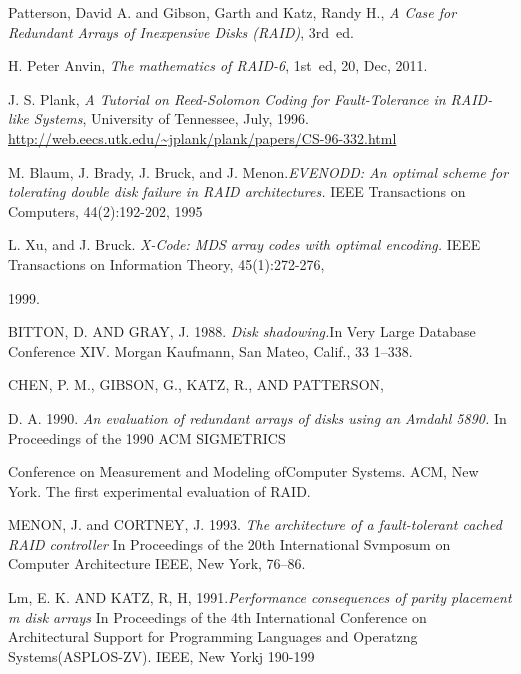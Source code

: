 \documentclass[journal]{IEEEtran}
\begin{document}
\begin{thebibliography}{1}


Patterson, David A. and Gibson, Garth and Katz, Randy H., \emph{A Case for Redundant Arrays of Inexpensive Disks (RAID)}, 3rd~ed.

H. Peter Anvin, \emph{The mathematics of RAID-6}, 1st~ed, 20, Dec, 2011.

J. S. Plank, \emph{A Tutorial on Reed-Solomon Coding for Fault-Tolerance in RAID-like Systems},  University of Tennessee, July, 1996. \url{http://web.eecs.utk.edu/~jplank/plank/papers/CS-96-332.html}


M. Blaum, J. Brady, J. Bruck, and J. Menon.\emph {EVENODD: An optimal scheme for tolerating double disk failure in RAID architectures.} IEEE Transactions on Computers, 44(2):192-202, 1995



L. Xu, and J. Bruck. \emph {X-Code: MDS array codes with optimal encoding.} IEEE Transactions on Information Theory, 45(1):272-276,

1999.



BITTON, D. AND GRAY, J. 1988. \emph {Disk shadowing.}In Very Large Database Conference XIV. Morgan Kaufmann, San Mateo, Calif., 33 1–338.



CHEN, P. M., GIBSON, G., KATZ, R., AND PATTERSON,

D. A. 1990. \emph {An evaluation of redundant arrays of disks using an Amdahl 5890.} In Proceedings of the 1990 ACM SIGMETRICS

Conference on Measurement and Modeling ofComputer Systems. ACM, New York. The first experimental evaluation of RAID.

MENON, J. and CORTNEY, J. 1993.\emph { The architecture of a fault-tolerant cached RAID controller} In Proceedings of the 20th International Svmposum on Computer Architecture IEEE, New York, 76–86.

Lm, E. K. AND KATZ, R, H, 1991.\emph {Performance consequences of parity placement m disk arrays} In Proceedings of the 4th International Conference on Architectural Support for Programming Languages and Operatzng Systems(ASPLOS-ZV). IEEE, New Yorkj 190-199
\end{thebibliography}
\end{document}
